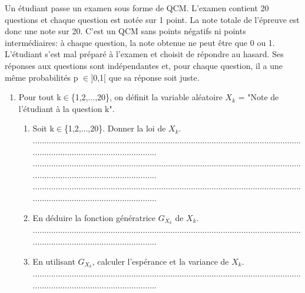 \documentclass{article}
\begin{document}
\begin{footnotesize}
Un étudiant passe un examen sous forme de QCM. L'examen contient 20 questions et chaque question est notée sur 1 point. La note totale de l'épreuve est donc une note sur 20. C'est un QCM sans points négatifs ni points intermédiaires: à chaque question, la note obtenue ne peut être que 0 ou 1.\newline
L'étudiant s'est mal préparé à l'examen et choisit de répondre au hasard. Ses réponses aux questions sont indépendantes et, pour chaque question, il a une même probabilités p $\in$]0,1[ que sa réponse soit juste.
\begin{enumerate}
    \item Pour tout k$\in$\{1,2,...,20\}, on définit la variable aléatoire $X_{k}$ = "Note de l'étudiant à la question k".
    \begin{enumerate}
        \item Soit k$\in$\{1,2,...,20\}. Donner la loi de $X_{k}$.\newline\newline
        ...........................................................................................................................................................................\newline
        ...........................................................................................................................................................................\newline
        ...........................................................................................................................................................................\newline\newline
        \item En déduire la fonction génératrice $G_{X_{k}}$ de $X_{k}$.\newline\newline
        ...........................................................................................................................................................................\newline\newline
        \item En utilisant $G_{X_{k}}$, calculer l'espérance et la variance de $X_{k}$.\newline\newline
        ...........................................................................................................................................................................\newline

\end{enumerate}
\end{enumerate}
\end{footnotesize}
\end{document}
